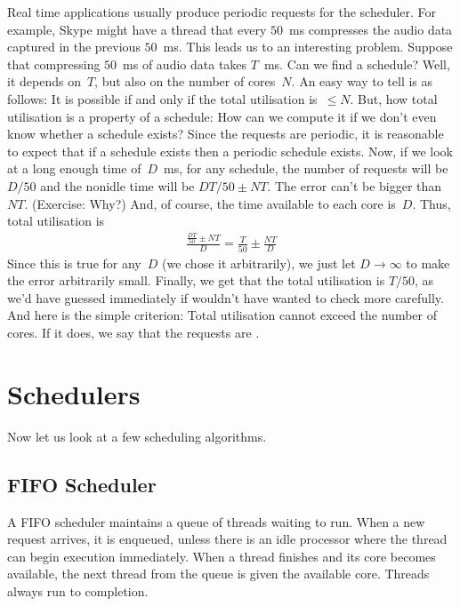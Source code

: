 Real time applications usually produce periodic requests for the scheduler.
For example,
  Skype might have a thread that every $50$~ms compresses the audio data
  captured in the previous $50$~ms.
This leads us to an interesting problem.
Suppose that compressing $50$~ms of audio data takes $T$~ms.
Can we find a schedule?
Well, it depends on~$T$, but also on the number of cores~$N$.
An easy way to tell is as follows:
  It is possible if and only if the total utilisation is~$\le N$.
But, how total utilisation is a property of a schedule:
  How can we compute it if we don't even know whether a schedule exists?
Since the requests are periodic,
  it is reasonable to expect that if a schedule exists then a periodic schedule exists. 
Now, if we look at a long enough time of~$D$~ms,
  for any schedule,
    the number of requests will be $D/50$
    and the nonidle time will be $DT/50\pm NT$.
The error can't be bigger than $NT$. (Exercise: Why?)
And, of course, the time available to each core is~$D$.
Thus, total utilisation is
\begin{align*}
\frac{\frac{DT}{50} \pm NT}{D}
  = \frac{T}{50} \pm \frac{NT}{D}
\end{align*}
Since this is true for any~$D$ (we chose it arbitrarily),
  we just let $D\to\infty$ to make the error arbitrarily small.
Finally, we get that the total utilisation is $T/50$,
  as we'd have guessed immediately if wouldn't have wanted to check more carefully.
And here is the simple criterion:
  Total utilisation cannot exceed the number of cores.
If it does, we say that the requests are .



\section{Schedulers}

Now let us look at a few scheduling algorithms.

\subsection{FIFO Scheduler}

A FIFO scheduler maintains a queue of threads waiting to run.
When a new request arrives,
  it is enqueued,
  unless there is an idle processor where the thread can begin execution immediately.
When a thread finishes and its core becomes available,
  the next thread from the queue is given the available core.
Threads always run to completion.

